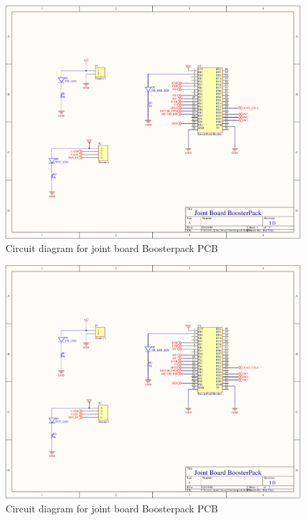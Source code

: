 \begin{figure}[H]
	\centering
	\includegraphics[page=3,scale=0.8,angle=270]{PDFs/joint_board_boosterpack.PDF}
	\caption{Circuit diagram for joint board Boosterpack PCB}
	\label{fig:joint_board_boosterpack_circuit3}
\end{figure}
\begin{figure}[H]
	\centering
	\includegraphics[page=4,scale=0.8,angle=270]{PDFs/joint_board_boosterpack.PDF}
	\caption{Circuit diagram for joint board Boosterpack PCB}
	\label{fig:joint_board_boosterpack_circuit4}
\end{figure}

